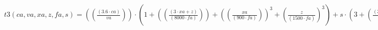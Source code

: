\documentclass[preview,border=1pt]{standalone}
\begin{document}
$
t3 (ca,va,xa,z,fa,s) = \left(\left(\frac{\left(\num{3.6}\cdot ca\right)}{va}\right)\right)\cdot \left(\num{1}+\left(\left(\frac{\left(\num{3}\cdot xa+z\right)}{\left(\num{8000}\cdot fa\right)}\right)\right)+\left(\left(\frac{xa}{\left(\num{900}\cdot fa\right)}\right)\right)^{\num{3}}+\left(\frac{z}{\left(\num{1500}\cdot fa\right)}\right)^{\num{3}}\right)+s\cdot \left(\num{3}+\left(\frac{\left(\num{3.6}\cdot ca\right)}{va}\right)\right)
$
\end{document}
